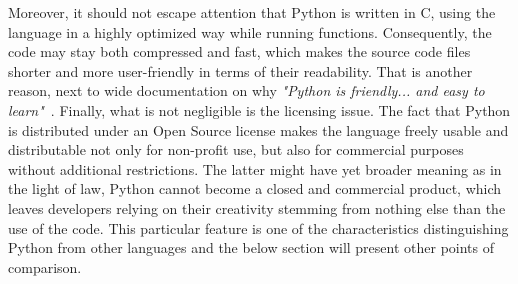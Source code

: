 Moreover, it should not escape attention that Python is written in C, using the language in a highly optimized way while running functions. Consequently, the code may stay both compressed and fast, which makes the source code files shorter and more user-friendly in terms of their readability. That is another reason, next to wide documentation on why \textit{"Python is friendly... and easy to learn"}~\cite{py_about}. Finally, what is not negligible is the licensing issue. The fact that Python is distributed under an Open Source license makes the language freely usable and distributable not only for non-profit use, but also for commercial purposes without additional restrictions. The latter might have yet broader meaning as in the light of law, Python cannot become a closed and commercial product, which leaves developers relying on their creativity stemming from nothing else than the use of the code. This particular feature is one of the characteristics distinguishing Python from other languages and the below section will present other points of comparison.

